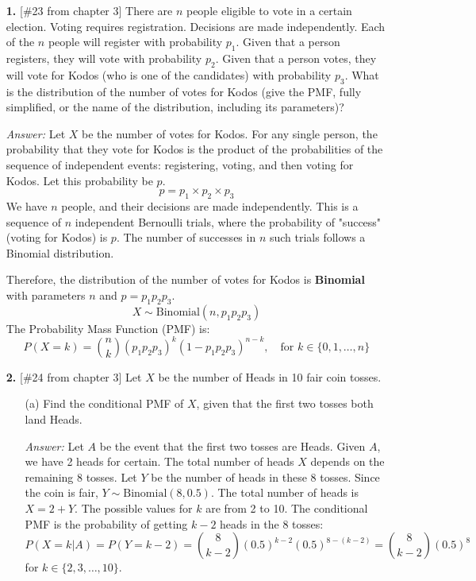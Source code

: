 \documentclass{article}
\begin{document}
\begin{enumerate}
    \item[\textbf{1.}] [\#23 from chapter 3] There are $n$ people eligible to vote in a certain election. Voting requires registration. Decisions are made independently. Each of the $n$ people will register with probability $p_{1}$. Given that a person registers, they will vote with probability $p_{2}$. Given that a person votes, they will vote for Kodos (who is one of the candidates) with probability $p_{3}$. What is the distribution of the number of votes for Kodos (give the PMF, fully simplified, or the name of the distribution, including its parameters)?

    \medskip
    \noindent \textit{Answer:}
    Let $X$ be the number of votes for Kodos. For any single person, the probability that they vote for Kodos is the product of the probabilities of the sequence of independent events: registering, voting, and then voting for Kodos. Let this probability be $p$.
    \[
        p = p_1 \times p_2 \times p_3
    \]
    We have $n$ people, and their decisions are made independently. This is a sequence of $n$ independent Bernoulli trials, where the probability of "success" (voting for Kodos) is $p$. The number of successes in $n$ such trials follows a Binomial distribution.
    
    Therefore, the distribution of the number of votes for Kodos is \textbf{Binomial} with parameters $n$ and $p = p_1 p_2 p_3$.
    \[
        X \sim \text{Binomial}(n, p_1 p_2 p_3)
    \]
    The Probability Mass Function (PMF) is:
    \[
        P(X=k) = \binom{n}{k} (p_1 p_2 p_3)^k (1 - p_1 p_2 p_3)^{n-k}, \quad \text{for } k \in \{0, 1, \dots, n\}
    \]
    
    \item[\textbf{2.}] [\#24 from chapter 3] Let $X$ be the number of Heads in 10 fair coin tosses.
    \begin{enumerate}
        \item[(a)] Find the conditional PMF of $X$, given that the first two tosses both land Heads.
        
        \medskip
        \noindent \textit{Answer:}
        Let $A$ be the event that the first two tosses are Heads. Given $A$, we have 2 heads for certain. The total number of heads $X$ depends on the remaining 8 tosses. Let $Y$ be the number of heads in these 8 tosses. Since the coin is fair, $Y \sim \text{Binomial}(8, 0.5)$. The total number of heads is $X = 2 + Y$. The possible values for $k$ are from 2 to 10. The conditional PMF is the probability of getting $k-2$ heads in the 8 tosses:
        \[
            P(X=k|A) = P(Y=k-2) = \binom{8}{k-2} (0.5)^{k-2} (0.5)^{8-(k-2)} = \binom{8}{k-2} (0.5)^8
        \]
        for $k \in \{2, 3, \dots, 10\}$.
        

\end{enumerate}
\end{enumerate}
\end{document}

